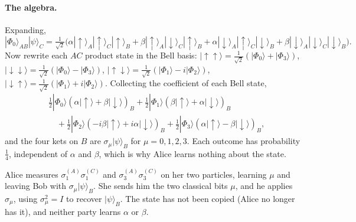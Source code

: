 \paragraph{The algebra.} Expanding,
\[
    |\Phi_0\rangle_{AB}|\psi\rangle_C = \tfrac{1}{\sqrt2}\bigl(\alpha|{\uparrow}\rangle_A|{\uparrow}\rangle_C|{\uparrow}\rangle_B + \beta|{\uparrow}\rangle_A|{\downarrow}\rangle_C|{\uparrow}\rangle_B + \alpha|{\downarrow}\rangle_A|{\uparrow}\rangle_C|{\downarrow}\rangle_B + \beta|{\downarrow}\rangle_A|{\downarrow}\rangle_C|{\downarrow}\rangle_B\bigr).
\]
Now rewrite each $AC$ product state in the Bell basis: $|{\uparrow\uparrow}\rangle = \frac{1}{\sqrt2}(|\Phi_0\rangle + |\Phi_3\rangle)$, $|{\downarrow\downarrow}\rangle = \frac{1}{\sqrt2}(|\Phi_0\rangle - |\Phi_3\rangle)$, $|{\uparrow\downarrow}\rangle = \frac{1}{\sqrt2}(|\Phi_1\rangle - i|\Phi_2\rangle)$, $|{\downarrow\uparrow}\rangle = \frac{1}{\sqrt2}(|\Phi_1\rangle + i|\Phi_2\rangle)$. Collecting the coefficient of each Bell state,
\begin{align*}
    &\tfrac12|\Phi_0\rangle(\alpha|{\uparrow}\rangle + \beta|{\downarrow}\rangle)_B + \tfrac12|\Phi_1\rangle(\beta|{\uparrow}\rangle + \alpha|{\downarrow}\rangle)_B\\
    &\quad + \tfrac12|\Phi_2\rangle(-i\beta|{\uparrow}\rangle + i\alpha|{\downarrow}\rangle)_B + \tfrac12|\Phi_3\rangle(\alpha|{\uparrow}\rangle - \beta|{\downarrow}\rangle)_B,
\end{align*}
and the four kets on $B$ are $\sigma_\mu|\psi\rangle_B$ for $\mu = 0,1,2,3$. Each outcome has probability $\frac14$, independent of $\alpha$ and $\beta$, which is why Alice learns nothing about the state.

\begin{fact}
Alice measures $\sigma_1^{(A)}\sigma_1^{(C)}$ and $\sigma_3^{(A)}\sigma_3^{(C)}$ on her two particles, learning $\mu$ and leaving Bob with $\sigma_\mu|\psi\rangle_B$. She sends him the two classical bits $\mu$, and he applies $\sigma_\mu$, using $\sigma_\mu^2 = I$ to recover $|\psi\rangle_B$. The state has not been copied (Alice no longer has it), and neither party learns $\alpha$ or $\beta$.
\end{fact}

